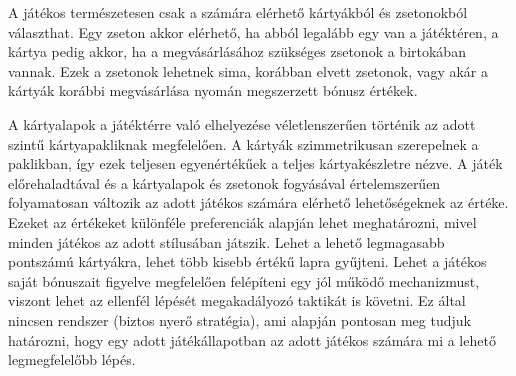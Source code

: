 A játékos természetesen csak a számára elérhető kártyákból és zsetonokból választhat. Egy zseton akkor elérhető, ha abból legalább egy van a játéktéren, a kártya pedig akkor, ha a megvásárlásához szükséges zsetonok a birtokában vannak. Ezek a zsetonok lehetnek sima, korábban elvett zsetonok, vagy akár a kártyák korábbi megvásárlása nyomán megszerzett bónusz értékek.

A kártyalapok a játéktérre való elhelyezése véletlenszerűen történik az adott szintű kártyapakliknak megfelelően. A kártyák szimmetrikusan szerepelnek a paklikban, így ezek teljesen egyenértékűek a teljes kártyakészletre nézve. A játék előrehaladtával és a kártyalapok és zsetonok fogyásával értelemszerűen folyamatosan változik az adott játékos számára elérhető lehetőségeknek az értéke. Ezeket az értékeket különféle preferenciák alapján lehet meghatározni, mivel minden játékos az adott stílusában játszik. Lehet a lehető legmagasabb pontszámú kártyákra, lehet több kisebb értékű lapra gyűjteni. Lehet a játékos saját bónuszait figyelve megfelelően felépíteni egy jól működő mechanizmust, viszont lehet az ellenfél lépését megakadályozó taktikát is követni. Ez által nincsen rendszer (biztos nyerő stratégia), ami alapján pontosan meg tudjuk határozni, hogy egy adott játékállapotban az adott játékos számára mi a lehető legmegfelelőbb lépés.

